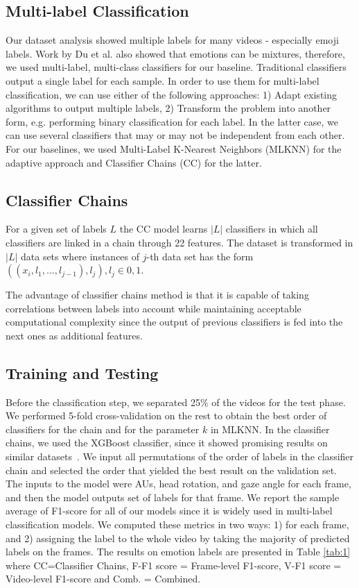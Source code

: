 \documentclass[letterpaper, 10 pt, conference]{ieeeconf}  \usepackage{FG2021}
\begin{document}
\subsection{Multi-label Classification}
Our dataset analysis showed multiple labels for many videos - especially emoji labels. Work by Du et al. \cite{DuE1454} also showed that emotions can be mixtures, therefore, we used multi-label, multi-class classifiers for our baseline. Traditional classifiers output a single label for each sample. In order to use them for multi-label classification, we can use either of the following approaches: 1) Adapt existing algorithms to output multiple labels, 2) Transform the problem into another form, e.g. performing binary classification for each label. In the latter case, we can use several classifiers that may or may not be independent from each other. For our baselines, we used Multi-Label K-Nearest Neighbors (MLKNN) \cite{zhang-mlknn} for the adaptive approach and Classifier Chains (CC) \cite{classifier_chains} for the latter. 

\subsection{Classifier Chains}
For a given set of labels $L$ the CC model learns $|L|$ classifiers in which all classifiers are linked in a chain through 22 features. The dataset is transformed in $|L|$ data sets where instances of $j$-th data set has the form $((x_i, l_1, ..., l_{j-1}),l_j), l_j \in {0,1}$.

The advantage of classifier chains method is that it is capable of taking correlations between labels into account while maintaining acceptable computational complexity since the output of previous classifiers is fed into the next ones as additional features. 

\subsection{Training and Testing}
Before the classification step, we separated 25\% of the videos for the test phase. We performed 5-fold cross-validation on the rest to obtain the best order of classifiers for the chain and for the parameter $k$ in MLKNN. In the classifier chains, we used the XGBoost \cite{xgboost} classifier, since it showed promising results on similar datasets~\cite{elderreact}. We input all permutations of the order of labels in the classifier chain and selected the order that yielded the best result on the validation set.
The inputs to the model were AUs, head rotation, and gaze angle for each frame, and then the model outputs set of labels for that frame. We report the sample average of F1-score for all of our models since it is widely used in multi-label classification models.
We computed these metrics in two ways: 1) for each frame, and 2) assigning the label to the whole video by taking the majority of predicted labels on the frames.
The results on emotion labels are presented in Table \ref{tab:1} where CC=Classifier Chains, F-F1 score = Frame-level F1-score, V-F1 score = Video-level F1-score and Comb. = Combined. 
\end{document}

